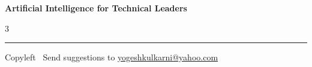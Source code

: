 \documentclass[8pt,landscape]{article}
\begin{document}
\footnotesize


\begin{center}
\Large{\textbf{Artificial Intelligence for Technical Leaders}} %
\end{center}

\begin{multicols}{3}

\end{multicols}

\rule{\linewidth}{0.25pt}
\scriptsize
Copyleft \textcopyleft\  Send suggestions to 
\href{http://yati.io}{yogeshkulkarni@yahoo.com}
\end{document}

